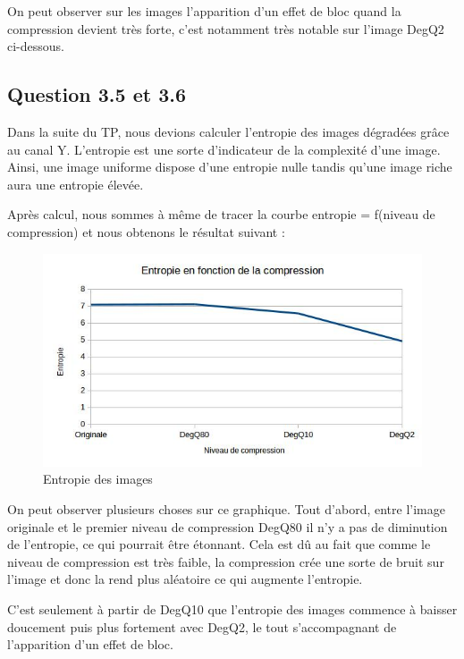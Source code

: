 \documentclass[12pt]{report}
\begin{document}
On peut observer sur les images l'apparition d'un effet de bloc quand la compression devient très forte, c'est notamment très notable sur l'image DegQ2 ci-dessous.

\subsection{Question 3.5 et 3.6}

Dans la suite du TP, nous devions calculer l'entropie des images dégradées grâce au canal Y. L'entropie est une sorte d'indicateur de la complexité d'une image. Ainsi, une image uniforme dispose d'une entropie nulle tandis qu'une image riche aura une entropie élevée.

Après calcul, nous sommes à même de tracer la courbe entropie = f(niveau de compression) et nous obtenons le résultat suivant :

\begin{figure}[H]
\begin{center}
\includegraphics[scale=0.8]{../ImageRes/entropie.jpg} 
\caption{Entropie des images}
\end{center}
\end{figure}

On peut observer plusieurs choses sur ce graphique. Tout d'abord, entre l'image originale et le premier niveau de compression DegQ80 il n'y a pas de diminution de l'entropie, ce qui pourrait être étonnant. Cela est dû au fait que comme le niveau de compression est très faible, la compression crée une sorte de bruit sur l'image et donc la rend plus aléatoire ce qui augmente l'entropie. 

C'est seulement à partir de DegQ10 que l'entropie des images commence à baisser doucement puis plus fortement avec DegQ2, le tout s'accompagnant de l'apparition d'un effet de bloc.
\end{document}
